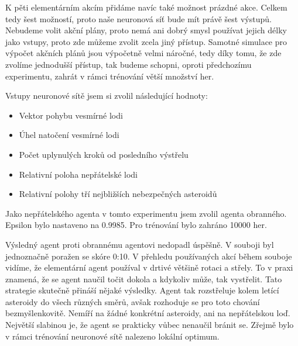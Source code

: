 \par
K pěti elementárním akcím přidáme navíc také možnost prázdné akce. Celkem tedy šest možností, proto naše neuronová síť bude mít právě šest výstupů.
Nebudeme volit akční plány, proto nemá ani dobrý smysl používat jejich délky jako vstupy, proto zde můžeme zvolit zcela jiný přístup.
Samotné simulace pro výpočet akčních plánů jsou výpočetně velmi náročné, tedy díky tomu, že zde zvolíme jednodušší přístup, tak budeme schopni, oproti předchozímu experimentu, zahrát v rámci trénování větší množství her.

\par
Vstupy neuronové sítě jsem si zvolil následující hodnoty:
\begin{itemize}
    \item Vektor pohybu vesmírné lodi
    \item Úhel natočení vesmírné lodi
    \item Počet uplynulých kroků od posledního výstřelu
    \item Relativní poloha nepřátelské lodi
    \item Relativní polohy tří nejbližších nebezpečných asteroidů
\end{itemize}

Jako nepřátelského agenta v tomto experimentu jsem zvolil agenta obranného.
Epsilon bylo nastaveno na 0.9985. Pro trénování bylo zahráno 10000 her.




Výsledný agent proti obrannému agentovi nedopadl úspěšně. V souboji byl jednoznačně poražen se skóre 0:10.
V přehledu používaných akcí během souboje vidíme, že elementární agent používal v drtivé většině rotaci a střely.
To v praxi znamená, že se agent naučil točit dokola a kdykoliv může, tak vystřelit. Tato strategie skutečně přináší nějaké výsledky.
Agent tak rozstřeluje kolem letící asteroidy do všech různých směrů, avšak rozhoduje se pro toto chování bezmyšlenkovitě. Nemíří na žádné konkrétní asteroidy, ani na nepřátelskou loď.
Největší slabinou je, že agent se prakticky vůbec nenaučil bránit se. Zřejmě bylo v rámci trénování neuronové sítě nalezeno lokální optimum.

